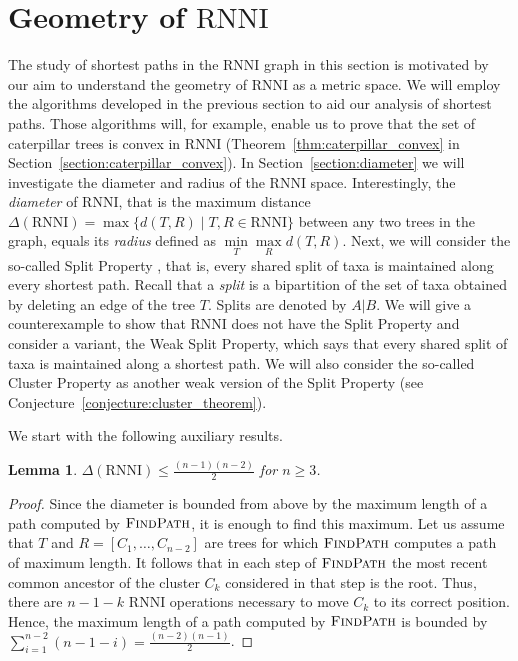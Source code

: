 \documentclass{amsart}
\newcommand{\rnni}{\mathrm{RNNI}}
\newcommand{\findpath}{\textsc{FindPath}}
\newtheorem{lemma}[theorem]{Lemma}
\begin{document}
\section{Geometry of $\rnni$}
\label{section:geometry}

The study of shortest paths in the $\rnni$ graph in this section is motivated by our aim to understand the geometry of $\rnni$ as a metric space.
We will employ the algorithms developed in the previous section to aid our analysis of shortest paths.
Those algorithms will, for example, enable us to prove that the set of caterpillar trees is convex in $\rnni$ (Theorem~\ref{thm:caterpillar_convex} in Section~\ref{section:caterpillar_convex}).
In Section~\ref{section:diameter} we will investigate the diameter and radius of the $\rnni$ space.
Interestingly, the \emph{diameter} of $\rnni$, that is the maximum distance $\Delta(\rnni) = \max \{d(T, R) \mid T, R \in \rnni\}$ between any two trees in the graph, equals its \emph{radius} defined as $\min\limits_T \max\limits_R d(T,R)$.
Next, we will consider the so-called Split Property \autocite{Gavryushkin2018-ol}, that is, every shared split of taxa is maintained along every shortest path.
Recall that a \emph{split} is a bipartition of the set of taxa obtained by deleting an edge of the tree $T$.
Splits are denoted by $A|B$.
We will give a counterexample to show that $\rnni$ does not have the Split Property and consider a variant, the Weak Split Property, which says that every shared split of taxa is maintained along a shortest path.
We will also consider the so-called Cluster Property as another weak version of the Split Property (see Conjecture~\ref{conjecture:cluster_theorem}).

We start with the following auxiliary results.

\begin{lemma}
$\Delta(\rnni) \leq \frac{(n-1)(n-2)}{2}$ for $n \geq 3$.
\label{lemma:diameter_bound}
\end{lemma}

\begin{proof}
Since the diameter is bounded from above by the maximum length of a path computed by $\findpath$, it is enough to find this maximum.
Let us assume that $T$ and $R = [C_1, \ldots, C_{n-2}]$ are trees for which $\findpath$ computes a path of maximum length.
It follows that in each step of $\findpath$ the most recent common ancestor of the cluster $C_k$ considered in that step is the root.
Thus, there are $n-1-k$ $\rnni$ operations necessary to move $C_k$ to its correct position.
Hence, the maximum length of a path computed by $\findpath$ is bounded by $\sum\limits_{i = 1}^{n-2} (n-1-i) = \frac{(n-2)(n-1)}{2}$.
\end{proof}
\end{document}
